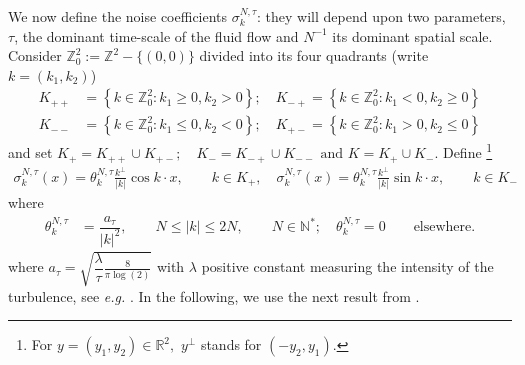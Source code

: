 \documentclass[a4paper,12pt, reqno]{amsart}
\newtheorem{lemma}[theorem]{Lemma}
\newcommand{\R}{\mathbb{R}}
\begin{document}
We now define the noise coefficients $\sigma_{k}^{N,\tau}$: they will depend upon two parameters, $\tau$, the dominant time-scale of the fluid flow and $N^{-1}$ its dominant spatial scale. 
Consider $\mathbb{Z}_{0}^{2}:=\mathbb{Z}^2-\{(0,0)\}$ divided into its four quadrants (write
$k=\left(  k_{1},k_{2}\right)  $)%
\begin{align*}
K_{++}  & =\left\{  k\in\mathbb{Z}_{0}^{2}:k_{1}\geq0,k_{2}>0\right\};\quad
K_{-+}   =\left\{  k\in\mathbb{Z}_{0}^{2}:k_{1}<0,k_{2}\geq0\right\}  \\
K_{--}  & =\left\{  k\in\mathbb{Z}_{0}^{2}:k_{1}\leq0,k_{2}<0\right\} ; \quad
K_{+-}   =\left\{  k\in\mathbb{Z}_{0}^{2}:k_{1}>0,k_{2}\leq0\right\}
\end{align*}
and set $  K_{+}   =K_{++}\cup K_{+-};  \quad 
K_{-}   =K_{-+}\cup K_{--}  \text{  and }   K=K_{+}\cup K_{-}.$
    Define \footnote{For $y=(y_1,y_2)\in   \R^2,$  $y^\perp$   stands  for $(-y_2,y_1).$}
\begin{align}\label{Def-sigma-k}
\sigma_{k}^{N,\tau}\left(  x\right)     =\theta_{k}^{N,\tau}\frac{k^{\perp}}{\left\vert
k\right\vert }\cos k\cdot x,\qquad k\in K_{+},  \quad 
\sigma_{k}^{N,\tau}\left(  x\right)     =\theta_{k}^{N,\tau}\frac{k^{\perp}}{\left\vert
k\right\vert }\sin k\cdot x,\qquad k\in K_{-}%
\end{align}
where
\begin{align}\label{scaling}
\theta^{N,\tau}_{k}&=\dfrac{a_\tau}{\left\vert k\right\vert^2 },  \qquad   N \leq \left\vert k\right\vert \leq  2N,\qquad N\in \mathbb{N}^* ; \quad
\theta^{N,\tau}_{k}=0 \qquad \text{elsewhere.}
\end{align}
where $a_\tau=\sqrt{\dfrac{\lambda}{\tau}\frac{8}{\pi \log(2)}}$ with $\lambda$ positive constant measuring the intensity of the turbulence, see  \textit{e.g.} \cite[Subsection 2.3.1]{tahraoui2025small}. In the following, we use
 the next result from \cite[Lemma 3]{Flandoli-Tahraoui}.
\end{document}

